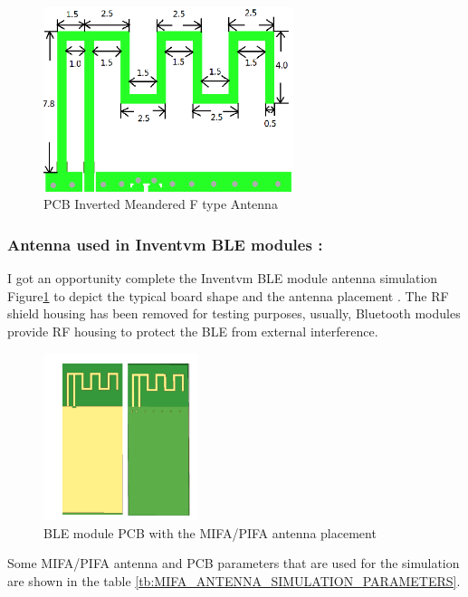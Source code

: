 \begin{figure}[h]
	\centering
	\includegraphics[width=0.65\textwidth]{Chap03/Figures/MIFA_Antenna.PNG}
	\caption{PCB Inverted Meandered F type Antenna \cite{NXP_AN11994_Antenna_Guide} }
	\label{fig:MIFA_Antenna_1}
\end{figure}

\subsubsection{Antenna used in Inventvm BLE modules :}
\indent I got an opportunity complete the Inventvm BLE module antenna simulation Figure\ref{fig:MIFA_Antenna_1} to depict the typical board shape and the antenna placement \cite{NXPBLE_Antenna_Guide}. The RF shield housing has been removed for testing purposes, usually, Bluetooth modules provide RF housing to protect the BLE from external interference.

\begin{figure}[h]
	\centering
	\includegraphics[width=0.4\textwidth]{Chap03/Figures/mifa_antenna_pcb_example.PNG}
	\caption{BLE module PCB with the MIFA/PIFA antenna placement}
	\label{fig:fig:PIFA_Antenna_PCB}
\end{figure}

Some MIFA/PIFA antenna and PCB parameters that are used for the simulation are shown in the table \ref{tb:MIFA_ANTENNA_SIMULATION_PARAMETERS}.

